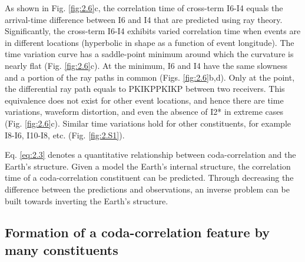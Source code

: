 As shown in Fig. \ref{fig:2.6}c, the correlation time of cross-term I6-I4 equals the arrival-time difference between I6 and I4 that are predicted using ray theory. Significantly, the cross-term I6-I4 exhibits varied correlation time when events are in different locations (hyperbolic in shape as a function of event longitude). The time variation curve has a saddle-point minimum around which the curvature is nearly flat (Fig. \ref{fig:2.6}c). At the minimum, I6 and I4 have the same slowness and a portion of the ray paths in common (Figs. \ref{fig:2.6}b,d). Only at the point, the differential ray path equals to PKIKPPKIKP between two receivers. This equivalence does not exist for other event locations, and hence there are time variations, waveform distortion, and even the absence of I2* in extreme cases (Fig. \ref{fig:2.6}c). Similar time variations hold for other constituents, for example I8-I6, I10-I8, etc. (Fig. \ref{fig:2.S1}).



Eq. \ref{eq:2.3} denotes a quantitative relationship between coda-correlation and the Earth's structure. Given a model the Earth's internal structure, the correlation time of a coda-correlation constituent can be predicted. Through decreasing the difference between the predictions and observations, an inverse problem can be built towards inverting the Earth's structure.



\subsection{Formation of a coda-correlation feature by many constituents}\label{subsec:theo_charc_form}



